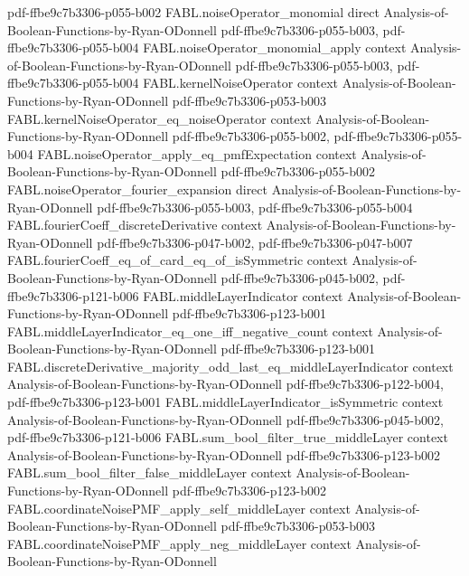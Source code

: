 \begin{theorem}
  {pdf-ffbe9c7b3306-p055-b002}
\proofstep
  {FABL.noiseOperator_monomial}
  {direct}
  {Analysis-of-Boolean-Functions-by-Ryan-ODonnell}
  {pdf-ffbe9c7b3306-p055-b003,
    pdf-ffbe9c7b3306-p055-b004}
\proofstep
  {FABL.noiseOperator_monomial_apply}
  {context}
  {Analysis-of-Boolean-Functions-by-Ryan-ODonnell}
  {pdf-ffbe9c7b3306-p055-b003,
    pdf-ffbe9c7b3306-p055-b004}
\proofstep
  {FABL.kernelNoiseOperator}
  {context}
  {Analysis-of-Boolean-Functions-by-Ryan-ODonnell}
  {pdf-ffbe9c7b3306-p053-b003}
\proofstep
  {FABL.kernelNoiseOperator_eq_noiseOperator}
  {context}
  {Analysis-of-Boolean-Functions-by-Ryan-ODonnell}
  {pdf-ffbe9c7b3306-p055-b002,
    pdf-ffbe9c7b3306-p055-b004}
\proofstep
  {FABL.noiseOperator_apply_eq_pmfExpectation}
  {context}
  {Analysis-of-Boolean-Functions-by-Ryan-ODonnell}
  {pdf-ffbe9c7b3306-p055-b002}
\proofstep
  {FABL.noiseOperator_fourier_expansion}
  {direct}
  {Analysis-of-Boolean-Functions-by-Ryan-ODonnell}
  {pdf-ffbe9c7b3306-p055-b003,
    pdf-ffbe9c7b3306-p055-b004}
\proofstep
  {FABL.fourierCoeff_discreteDerivative}
  {context}
  {Analysis-of-Boolean-Functions-by-Ryan-ODonnell}
  {pdf-ffbe9c7b3306-p047-b002,
    pdf-ffbe9c7b3306-p047-b007}
\proofstep
  {FABL.fourierCoeff_eq_of_card_eq_of_isSymmetric}
  {context}
  {Analysis-of-Boolean-Functions-by-Ryan-ODonnell}
  {pdf-ffbe9c7b3306-p045-b002,
    pdf-ffbe9c7b3306-p121-b006}
\proofstep
  {FABL.middleLayerIndicator}
  {context}
  {Analysis-of-Boolean-Functions-by-Ryan-ODonnell}
  {pdf-ffbe9c7b3306-p123-b001}
\proofstep
  {FABL.middleLayerIndicator_eq_one_iff_negative_count}
  {context}
  {Analysis-of-Boolean-Functions-by-Ryan-ODonnell}
  {pdf-ffbe9c7b3306-p123-b001}
\proofstep
  {FABL.discreteDerivative_majority_odd_last_eq_middleLayerIndicator}
  {context}
  {Analysis-of-Boolean-Functions-by-Ryan-ODonnell}
  {pdf-ffbe9c7b3306-p122-b004,
    pdf-ffbe9c7b3306-p123-b001}
\proofstep
  {FABL.middleLayerIndicator_isSymmetric}
  {context}
  {Analysis-of-Boolean-Functions-by-Ryan-ODonnell}
  {pdf-ffbe9c7b3306-p045-b002,
    pdf-ffbe9c7b3306-p121-b006}
\proofstep
  {FABL.sum_bool_filter_true_middleLayer}
  {context}
  {Analysis-of-Boolean-Functions-by-Ryan-ODonnell}
  {pdf-ffbe9c7b3306-p123-b002}
\proofstep
  {FABL.sum_bool_filter_false_middleLayer}
  {context}
  {Analysis-of-Boolean-Functions-by-Ryan-ODonnell}
  {pdf-ffbe9c7b3306-p123-b002}
\proofstep
  {FABL.coordinateNoisePMF_apply_self_middleLayer}
  {context}
  {Analysis-of-Boolean-Functions-by-Ryan-ODonnell}
  {pdf-ffbe9c7b3306-p053-b003}
\proofstep
  {FABL.coordinateNoisePMF_apply_neg_middleLayer}
  {context}
  {Analysis-of-Boolean-Functions-by-Ryan-ODonnell}

\end{theorem}
